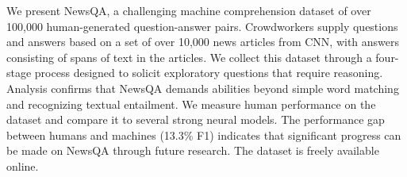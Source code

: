 We present NewsQA, a challenging machine comprehension dataset of over 100,000 human-generated question-answer pairs. Crowdworkers supply questions and answers based on a set of over 10,000 news articles from CNN, with answers consisting of spans of text in the articles. We collect this dataset through a four-stage process designed to solicit exploratory questions that require reasoning. Analysis confirms that NewsQA demands abilities beyond simple word matching and recognizing textual entailment. We measure human performance on the dataset and compare it to several strong neural models. The performance gap between humans and machines (13.3\% F1) indicates that significant progress can be made on NewsQA through future research. The dataset is freely available online.
